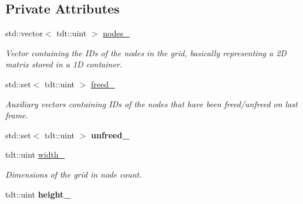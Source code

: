 \subsection*{Private Attributes}
\begin{DoxyCompactItemize}
\item 
std\+::vector$<$ tdt\+::uint $>$ \hyperlink{class_grid_a8727a9b7b5f21d30b6e3f9c7468dc305}{nodes\+\_\+}
\begin{DoxyCompactList}\small\item\em Vector containing the I\+Ds of the nodes in the grid, basically representing a 2D matrix stored in a 1D container. \end{DoxyCompactList}\item 
std\+::set$<$ tdt\+::uint $>$ \hyperlink{class_grid_a7a4fbc012ddbfcc4330b8042f83e79cb}{freed\+\_\+}
\begin{DoxyCompactList}\small\item\em Auxiliary vectors containing I\+Ds of the nodes that have been freed/unfreed on last frame. \end{DoxyCompactList}\item 
std\+::set$<$ tdt\+::uint $>$ {\bfseries unfreed\+\_\+}\hypertarget{class_grid_a59f7f85caaae4da20336f2eb042f8fb2}{}\label{class_grid_a59f7f85caaae4da20336f2eb042f8fb2}

\item 
tdt\+::uint \hyperlink{class_grid_a43488ca041b50c8926de53d2cbcd3070}{width\+\_\+}
\begin{DoxyCompactList}\small\item\em Dimensions of the grid in node count. \end{DoxyCompactList}\item 
tdt\+::uint {\bfseries height\+\_\+}\hypertarget{class_grid_a199f5d61fff3e1a250bab5acb687184f}{}\label{class_grid_a199f5d61fff3e1a250bab5acb687184f}


\end{DoxyCompactItemize}

